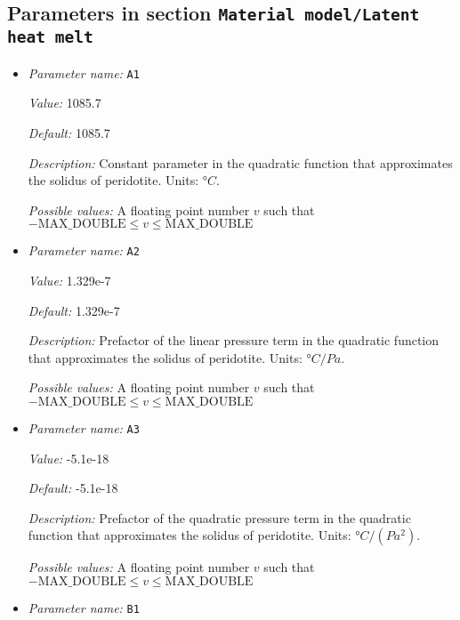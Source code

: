 \subsection{Parameters in section \tt Material model/Latent heat melt}
\label{parameters:Material_20model/Latent_20heat_20melt}

\begin{itemize}
\item {\it Parameter name:} {\tt A1}
\label{parameters:Material model/Latent heat melt/A1}


{\it Value:} 1085.7


{\it Default:} 1085.7


{\it Description:} Constant parameter in the quadratic function that approximates the solidus of peridotite. Units: $°C$.


{\it Possible values:} A floating point number $v$ such that $-\text{MAX\_DOUBLE} \leq v \leq \text{MAX\_DOUBLE}$
\item {\it Parameter name:} {\tt A2}
\label{parameters:Material model/Latent heat melt/A2}


{\it Value:} 1.329e-7


{\it Default:} 1.329e-7


{\it Description:} Prefactor of the linear pressure term in the quadratic function that approximates the solidus of peridotite. Units: $°C/Pa$.


{\it Possible values:} A floating point number $v$ such that $-\text{MAX\_DOUBLE} \leq v \leq \text{MAX\_DOUBLE}$
\item {\it Parameter name:} {\tt A3}
\label{parameters:Material model/Latent heat melt/A3}


{\it Value:} -5.1e-18


{\it Default:} -5.1e-18


{\it Description:} Prefactor of the quadratic pressure term in the quadratic function that approximates the solidus of peridotite. Units: $°C/(Pa^2)$.


{\it Possible values:} A floating point number $v$ such that $-\text{MAX\_DOUBLE} \leq v \leq \text{MAX\_DOUBLE}$
\item {\it Parameter name:} {\tt B1}
\label{parameters:Material model/Latent heat melt/B1}



\end{itemize}
